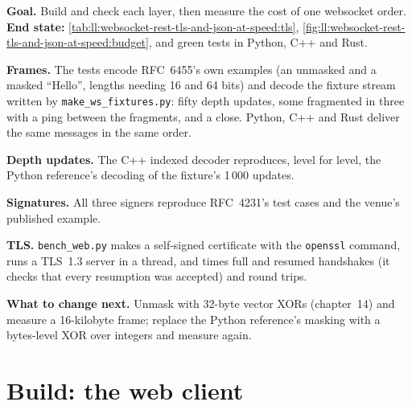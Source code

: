 \begin{tutorial}
\textbf{Goal.} Build and check each layer, then measure the cost of one websocket order. \textbf{End state:}
\cref{tab:ll:websocket-rest-tls-and-json-at-speed:tls}, \cref{fig:ll:websocket-rest-tls-and-json-at-speed:budget}, and
green tests in Python, C++ and Rust.
\begin{tutsteps}
\item \textbf{Frames.} The tests encode RFC~6455's own examples (an unmasked and a masked ``Hello'', lengths needing 16 and 64
bits) and decode the fixture stream written by \texttt{make\_ws\_fixtures.py}: fifty depth updates, some fragmented in three
with a ping between the fragments, and a close. Python, C++ and Rust deliver the same messages in the same order.
\item \textbf{Depth updates.} The C++ indexed decoder reproduces, level for level, the Python reference's decoding of the
fixture's 1\,000 updates.
\item \textbf{Signatures.} All three signers reproduce RFC~4231's test cases and the venue's published example.
\item \textbf{TLS.} \texttt{bench\_web.py} makes a self-signed certificate with the \texttt{openssl} command, runs a TLS~1.3
server in a thread, and times full and resumed handshakes (it checks that every resumption was accepted) and round trips.
\end{tutsteps}
\textbf{What to change next.} Unmask with 32-byte vector XORs (chapter~14) and measure a 16-kilobyte frame; replace the Python
reference's masking with a bytes-level XOR over integers and measure again.
\end{tutorial}

\section{Build: the web client}\label{bld:ll:websocket-rest-tls-and-json-at-speed:wsclient}

